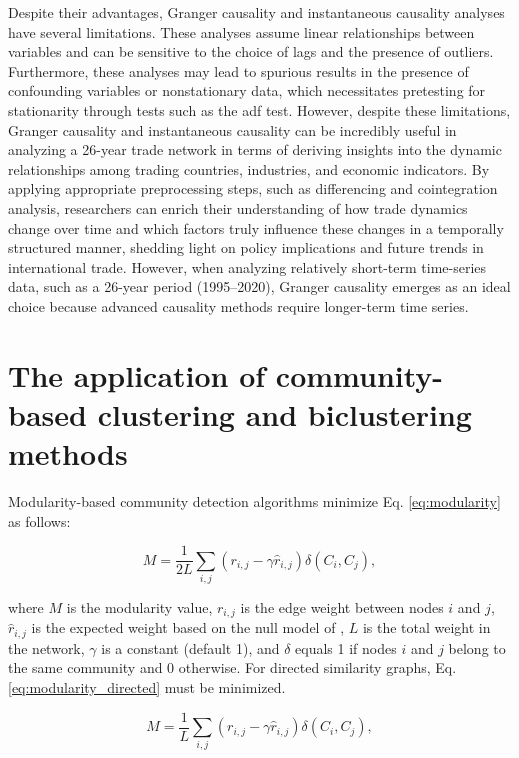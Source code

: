 \documentclass[preprint, 3p,
authoryear]{elsarticle} %
\begin{document}
Despite their advantages, Granger causality and instantaneous causality
analyses have several limitations. These analyses assume linear
relationships between variables and can be sensitive to the choice of
lags and the presence of outliers. Furthermore, these analyses may lead
to spurious results in the presence of confounding variables or
nonstationary data, which necessitates pretesting for stationarity
through tests such as the \gls{adf} test. However, despite these
limitations, Granger causality and instantaneous causality can be
incredibly useful in analyzing a 26-year trade network in terms of
deriving insights into the dynamic relationships among trading
countries, industries, and economic indicators. By applying appropriate
preprocessing steps, such as differencing and cointegration analysis,
researchers can enrich their understanding of how trade dynamics change
over time and which factors truly influence these changes in a
temporally structured manner, shedding light on policy implications and
future trends in international trade. However, when analyzing relatively
short-term time-series data, such as a 26-year period (1995--2020),
Granger causality emerges as an ideal choice because advanced causality
methods require longer-term time series.

\section{The application of community-based clustering and biclustering
methods}\label{sec:settingcluster}

Modularity-based community detection algorithms minimize Eq.
\eqref{eq:modularity} as follows:

\begin{equation} \label{eq:modularity}
M = \frac{1}{2L} \displaystyle\sum_{i,j} \left(r_{i,j}- \gamma\hat{r}_{i,j}\right) \delta(C_i,C_j),
\end{equation}

\noindent  where \(M\) is the modularity value, \(r_{i,j}\) is the edge
weight between nodes \(i\) and \(j\), \(\hat{r}_{i,j}\) is the expected
weight based on the null model of \cite{newman2006modularity}, \(L\) is
the total weight in the network, \(\gamma\) is a constant (default 1),
and \(\delta\) equals 1 if nodes \(i\) and \(j\) belong to the same
community and 0 otherwise. For directed similarity graphs, Eq.
\eqref{eq:modularity_directed} must be minimized.

\begin{equation} \label{eq:modularity_directed}
M = \frac{1}{L} \displaystyle\sum_{i,j} \left(r_{i,j}- \gamma\hat{r}_{i,j}\right) \delta(C_i,C_j),
\end{equation}
\end{document}

